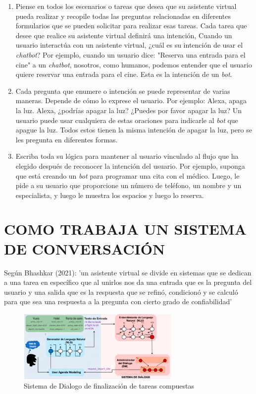 \documentclass[letter, openright, 12pt]{book}
\newcommand*\setcaptioncitation[1]{\def\captioncitation{\textit{Fuente:}~#1}}
\let\captioncitation\relax
\begin{document}
\begin{enumerate}[label=(\alph*)]
\item Piense en todos los escenarios o tareas que desea que su asistente virtual pueda realizar y recopile todas las preguntas relacionadas en diferentes formularios que se pueden solicitar para realizar esas tareas. Cada tarea que desee que realice su asistente virtual definirá una intención, Cuando un usuario interactúa con un asistente virtual, ¿cuál es su intención de usar el \textit{chatbot}? Por ejemplo, cuando un usuario dice: "Reserva una entrada para el cine" a un \textit{chatbot}, nosotros, como humanos, podemos entender que el usuario quiere reservar una entrada para el cine. Esta es la intención de un \textit{bot}. 
\item Cada pregunta que enumere o intención se puede representar de varias maneras. Depende de cómo lo exprese el usuario. Por ejemplo: Alexa, apaga la luz. Alexa, ¿podrías apagar la luz? ¿Puedes por favor apagar la luz? Un usuario puede usar cualquiera de estas oraciones para indicarle al \textit{bot} que apague la luz. Todos estos tienen la misma intención de apagar la luz, pero se les pregunta en diferentes formas.  
\item Escriba toda su lógica para mantener al usuario vinculado al flujo que ha elegido después de reconocer la intención del usuario. Por ejemplo, suponga que está creando un \textit{bot} para programar una cita con el médico. Luego, le pide a su usuario que proporcione un número de teléfono, un nombre y un especialista, y luego le muestra los espacios y luego lo reserva.
\end{enumerate}


\section{COMO TRABAJA UN SISTEMA DE CONVERSACIÓN}

Según Bhashkar (2021): 'un asistente virtual se divide en sistemas que se dedican a una tarea en específico que al unirlos nos da una entrada que es la pregunta del usuario y una salida que es la respuesta que se refinó, condicionó y se calculó para que sea una respuesta a la pregunta con cierto grado de confiabilidad'

\begin{figure}[H]
\begin{center}
\includegraphics[width=0.7\textwidth]{figura2_2}
\setcaptioncitation{(Microsoft, 2016)}
\caption{Sistema de Dialogo de finalización de tareas compuestas}
\label{tab:figura2_2}
\end{center}
\end{figure}
\end{document}
